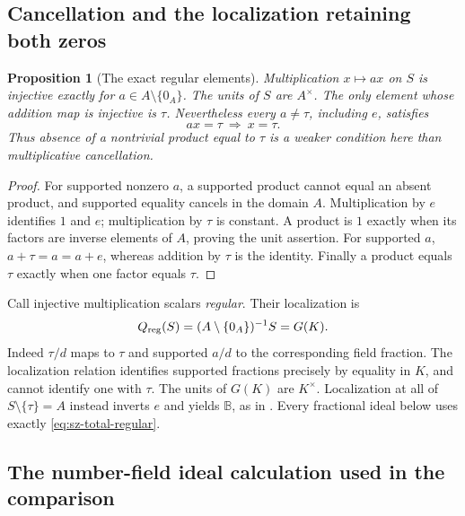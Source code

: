 \documentclass[11pt,a4paper]{article}
\newtheorem{proposition}[theorem]{Proposition}
\theoremstyle{definition}\newtheorem{definition}[theorem]{Definition}
\begin{document}
\subsection{Cancellation and the localization retaining both zeros}

\begin{proposition}[The exact regular elements]\label{prop:sz-regular}
Multiplication \(x\mapsto ax\) on \(S\) is injective exactly for
\(a\in A\setminus\{0_A\}\). The units of \(S\) are \(A^\times\).
The only element whose addition map is injective is \(\tau\).
Nevertheless every \(a\ne\tau\), including \(e\), satisfies
\[
 ax=\tau\ \Longrightarrow\ x=\tau .
\]
Thus absence of a nontrivial product equal to \(\tau\) is a weaker
condition here than multiplicative cancellation.
\end{proposition}
\begin{proof}
For supported nonzero \(a\), a supported product cannot equal an
absent product, and supported equality cancels in the domain \(A\).
Multiplication by \(e\) identifies \(1\) and \(e\); multiplication
by \(\tau\) is constant. A product is \(1\) exactly when its factors
are inverse elements of \(A\), proving the unit assertion.
For supported \(a\), \(a+\tau=a=a+e\), whereas addition by \(\tau\)
is the identity. Finally a product equals \(\tau\) exactly when one
factor equals \(\tau\).
\end{proof}

Call injective multiplication scalars \emph{regular}. Their localization is
\begin{equation}\label{eq:sz-total-regular}
 Q_{\rm reg}(S)=(A\setminus\{0_A\})^{-1}S=G(K).
\end{equation}
Indeed \(\tau/d\) maps to \(\tau\) and supported \(a/d\) to the
corresponding field fraction. The localization relation identifies
supported fractions precisely by equality in \(K\), and cannot identify
one with \(\tau\). The units of \(G(K)\) are \(K^\times\).
Localization at all of \(S\setminus\{\tau\}=A\) instead inverts \(e\)
and yields \(\mathbb B\), as in
\cite[\texttt{thm:frac-collapse}]{globalization}. Every fractional
ideal below uses exactly \eqref{eq:sz-total-regular}.

\subsection{The number-field ideal calculation used in the comparison}
\end{document}
